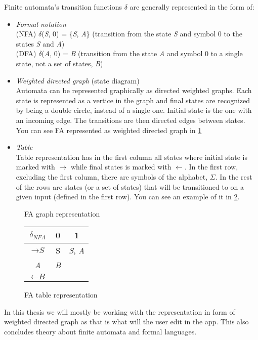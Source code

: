 Finite automata's transition functions $\delta$ are generally represented in the form of:
\begin{itemize}
    \item \textit{Formal notation}\\
    (NFA) $\delta$(\textit{S}, 0) = \{\textit{S}, \textit{A}\} (transition from the state \textit{S} and symbol 0 to the states \textit{S} and \textit{A})\\
    (DFA) $\delta$(\textit{A}, 0) = \textit{B} (transition from the state \textit{A} and symbol 0 to a single state, not a set of states, \textit{B})
    \item \textit{Weighted directed graph} (state diagram)\\
    Automata can be represented graphically as directed weighted graphs. Each state is represented as a vertice in the graph and final states are recognized by being a double circle, instead of a single one. Initial state is the one with an incoming edge. The transitions are then directed edges between states. You can see FA represented as weighted directed graph in \ref{graph-representation}
    \item \textit{Table}\\
    Table representation has in the first column all states where initial state is marked with $\rightarrow$ while final states is marked with $\leftarrow$. In the first row, excluding the first column, there are symbols of the alphabet, $\Sigma$. In the rest of the rows are states (or a set of states) that will be transitioned to on a given input (defined in the first row). You can see an example of it in \ref{table-representation}.
\end{itemize}
\begin{figure}
\caption{FA graph representation}\label{graph-representation}
\end{figure}
\begin{figure}
\begin{tabular}{||c|c|c||} 
    \hline
    $\delta_{NFA}$ & 0 & 1 \\ [0.5ex] 
    \hline\hline
    $\rightarrow \textit{S}$ & S & \textit{S}, \textit{A} \\ 
    \hline
    \textit{A} & \textit{B} & \\
    \hline
    $\leftarrow \textit{B}$ &  & \\
    \hline
\end{tabular}
\caption{FA table representation}\label{table-representation}
\end{figure}
In this thesis we will mostly be working with the representation in form of weighted directed graph as that is what will the user edit in the app.
This also concludes theory about finite automata and formal languages.

